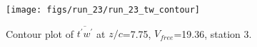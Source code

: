 \begin{figure}[H]
\centering
\texttt{[image: figs/run\_23/run\_23\_tw\_contour]}
\caption{Contour plot of $\overline{t^\prime w^\prime}$ at $z/c$=7.75, $V_{free}$=19.36, station 3.}
\label{fig:run_23_tw_contour}
\end{figure}



